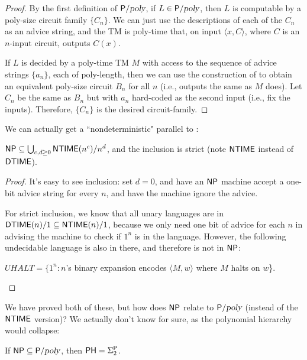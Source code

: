\begin{proof}
By the first definition of ${\mathsf{P}}/{\textsl{poly}}$, if $L \in {\ensuremath{\mathsf{P}}}/{\textsl{poly}}$, then $L$ is computable by a poly-size circuit family $\{C_n\}$. We can just use the descriptions of each of the $C_n$ as an advice string, and the TM is poly-time that, on input $\langle x, C \rangle$, where $C$ is an $n$-input circuit, outputs $C(x)$. 

\par If $L$ is decided by a poly-time TM $M$ with access to the sequence of advice strings $\{a_n\}$, each of poly-length, then we can use the construction of  to obtain an equivalent poly-size circuit $B_n$ for all $n$ (i.e., outputs the same as $M$ does). Let $C_n$ be the same as $B_n$ but with $a_n$ hard-coded as the second input (i.e., fix the inputs). Therefore, $\{C_n\}$ is the desired circuit-family.
\end{proof}

We can actually get a ``nondeterministic" parallel to :

\begin{theorem}
${\mathsf{NP}} \subseteq \bigcup_{c, d \ge 0} {\mathsf{NTIME}}(n^c)/n^d$, and the inclusion is strict (note ${\mathsf{NTIME}}$ instead of ${\mathsf{DTIME}}$).
\end{theorem}

\begin{proof}
It's easy to see inclusion: set $d = 0$, and have an ${\mathsf{NP}}$ machine accept a one-bit advice string for every $n$, and have the machine ignore the advice. 

\par For strict inclusion, we know that all unary languages are in ${\mathsf{DTIME}}(n)/1 \subseteq {\ensuremath{\mathsf{NTIME}}}(n)/1$, because we only need one bit of advice for each $n$ in advising the machine to check if $1^n$ is in the language. However, the following undecidable language is also in there, and therefore is not in ${\mathsf{NP}}$:
\begin{center}
$UHALT = \{1^n \colon n$'s binary expansion encodes $\langle M, w \rangle$ where $M$ halts on $w$\}.
\end{center}
\end{proof}

We have proved both of these, but how does ${\mathsf{NP}}$ relate to ${\mathsf{P}}/{\textsl{poly}}$ (instead of the ${\mathsf{NTIME}}$ version)? We actually don't know for sure, as the polynomial hierarchy would collapse:

\begin{theorem}
If ${\mathsf{NP}} \subseteq {\ensuremath{\mathsf{P}}}/{\textsl{poly}}$, then ${\mathsf{PH}} = \Sigma_2^{\mathsf{P}}$.
\end{theorem}

